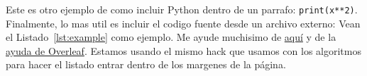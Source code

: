 Este es otro ejemplo de como incluir Python dentro de un parrafo: \texttt{print(x**2)}.
Finalmente, lo mas util es incluir el codigo fuente desde un archivo externo: Vean  el Listado~\ref{lst:example} como ejemplo.
Me ayude muchisimo de \href{https://tex.stackexchange.com/questions/252263/alignment-of-minted-line-numbers}{aquí} y de la \href{https://www.overleaf.com/learn/latex/Code_Highlighting_with_minted}{ayuda de Overleaf}.
Estamos usando el mismo \textenglish{hack} que usamos con los algoritmos para hacer el listado entrar dentro de los margenes de la página.


